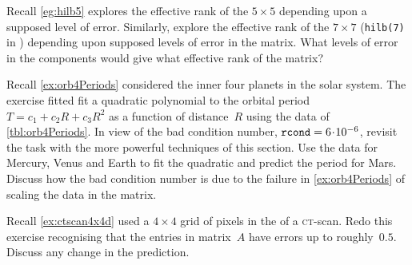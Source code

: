 \begin{exercise} \label{ex:hilb7} 
Recall \autoref{eg:hilb5} explores the effective rank of the \(5\times5\)  depending upon a supposed level of error.
Similarly, explore the effective rank of the \(7\times7\)  (\verb|hilb(7)| in \script) depending upon supposed levels of error in the matrix.
What levels of error in the components would give what effective rank of the matrix?
\end{exercise}









\begin{exercise} \label{ex:orb4Periods2} 
Recall \autoref{ex:orb4Periods} considered the inner four planets in the solar system.
The exercise fitted fit a quadratic polynomial to the orbital period \(T=c_1+c_2R+c_3R^2\) as a function of distance~\(R\) using the data of \autoref{tbl:orb4Periods}.
In view of the bad condition number, \(\verb|rcond|=6\cdot10^{-6}\), revisit the task with the more powerful techniques of this section.
Use the data for Mercury, Venus and Earth to fit the quadratic and predict the period for Mars.
Discuss how the bad condition number is due to the failure in \autoref{ex:orb4Periods} of scaling the data in the matrix.
\end{exercise}



\begin{exercise} \label{ex:} 
Recall \autoref{ex:ctscan4x4d} used a \(4\times4\) grid of pixels in the  of a \textsc{ct}-scan.
Redo this exercise recognising that the entries in matrix~\(A\) have errors up to roughly~\(0.5\).
Discuss any change in the prediction.
\end{exercise}




